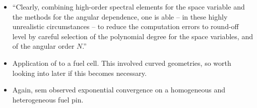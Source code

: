\begin{itemize}
  \item ``Clearly, combining high-order spectral elements for the space variable and the \Sn methods for the angular dependence, one is able -- in these highly unrealistic circumstances -- to reduce the computation errors to round-off level by careful selection of the polynomial degree for the space variables, and of the angular order $N$.''
  \item Application of \An to a fuel cell. This involved curved geometries, so worth looking into later if this becomes necessary.
  \item Again, \gls{sem} observed exponential convergence on a homogeneous and heterogeneous fuel pin.
\end{itemize}